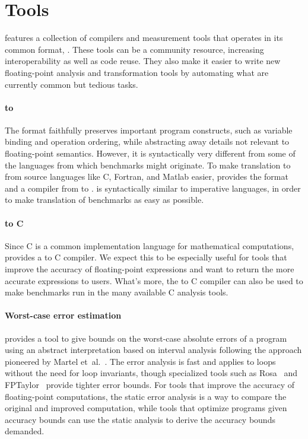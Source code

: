 \documentclass[main.tex]{subfiles}
\begin{document}
\section{Tools}
\label{sec:tools}

\name features
  a collection of compilers and measurement tools
  that operates in its common format, \core.
These tools can be a community resource,
  increasing interoperability as well as code reuse.
They also make it easier to write
  new floating-point analysis and transformation tools
  by automating what are currently
  common but tedious tasks.

\paragraph{\surface to \core}
The \core format faithfully preserves important program constructs,
  such as variable binding and operation ordering,
  while abstracting away details not relevant
  to floating-point semantics.
However, it is syntactically very different
  from some of the languages from which benchmarks might originate.
To make translation to \core from source languages
  like C, Fortran, and Matlab easier,
  \name provides the \surface format
  and a compiler from \surface to \core.
\surface is syntactically similar to imperative languages,
  in order to make translation of benchmarks as easy as possible.

\paragraph{\core to C}
Since C is a common implementation language for mathematical computations,
  \name provides a \core to C compiler.
We expect this to be especially useful for tools
  that improve the accuracy of floating-point expressions
  and want to return the more accurate expressions to users.
What's more, the \core to C compiler can also be used to make \core benchmarks
run in the many available C analysis tools.

\paragraph{Worst-case error estimation}
\name provides a tool to give bounds on
  the worst-case absolute errors of a \core program
  using an abstract interpretation based on interval analysis
  following the approach pioneered by Martel et~al.~\cite{fmics15}.
The error analysis is fast
  and applies to loops without the need for loop invariants,
  though specialized tools such as Rosa~\cite{DarulovaK14}
  and FPTaylor~\cite{fptaylor-fm15}
  provide tighter error bounds.
For tools that improve the accuracy of floating-point computations,
  the static error analysis is a way to compare
  the original and improved computation,
  while tools that optimize programs given accuracy bounds
  can use the static analysis to derive the accuracy bounds demanded.
\end{document}
